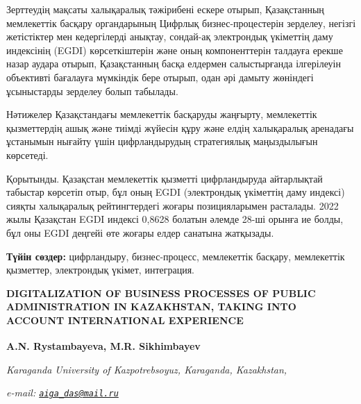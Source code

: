Зерттеудің мақсаты халықаралық тәжірибені ескере отырып, Қазақстанның
мемлекеттік басқару органдарының Цифрлық бизнес-процестерін зерделеу,
негізгі жетістіктер мен кедергілерді анықтау, сондай-ақ электрондық
үкіметтің даму индексінің (EGDI) көрсеткіштерін және оның компоненттерін
талдауға ерекше назар аудара отырып, Қазақстанның басқа елдермен
салыстырғанда ілгерілеуін объективті бағалауға мүмкіндік бере отырып,
одан әрі дамыту жөніндегі ұсыныстарды зерделеу болып табылады.

Нәтижелер Қазақстандағы мемлекеттік басқаруды жаңғырту, мемлекеттік
қызметтердің ашық және тиімді жүйесін құру және елдің халықаралық
аренадағы ұстанымын нығайту үшін цифрландырудың стратегиялық
маңыздылығын көрсетеді.

Қорытынды. Қазақстан мемлекеттік қызметті цифрландыруда айтарлықтай
табыстар көрсетіп отыр, бұл оның EGDI (электрондық үкіметтің даму
индексі) сияқты халықаралық рейтингтердегі жоғары позицияларымен
расталады. 2022 жылы Қазақстан EGDI индексі 0,8628 болатын әлемде 28-ші
орынға ие болды, бұл оны EGDI деңгейі өте жоғары елдер санатына
жатқызады.

{\bfseries Түйін сөздер:} цифрландыру, бизнес-процесс, мемлекеттік басқару,
мемлекеттік қызметтер, электрондық үкімет, интеграция.

\begin{articleheader}
{\bfseries DIGITALIZATION OF BUSINESS PROCESSES OF PUBLIC ADMINISTRATION IN KAZAKHSTAN, TAKING INTO ACCOUNT INTERNATIONAL EXPERIENCE}

{\bfseries  
A.N. Rystambayeva\textsuperscript{\envelope },  
M.R. Sikhimbayev}
\end{articleheader}

\begin{affiliation}
\emph{Karaganda University of Kazpotrebsoyuz, Karaganda, Kazakhstan,}

\emph{e-mail: \href{mailto:aiga_das@mail.ru}{\nolinkurl{aiga\_das@mail.ru}}}
\end{affiliation}

